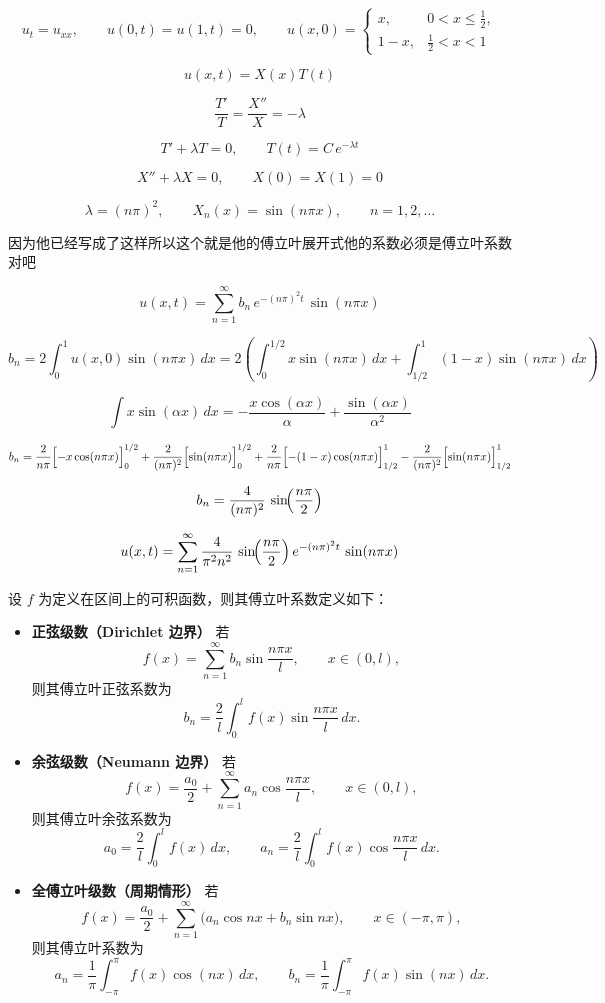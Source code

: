 \begin{solution}
\[
u_t=u_{xx},\qquad u(0,t)=u(1,t)=0,\qquad 
u(x,0)=
\begin{cases}
x,&0<x\le \frac12,\\[2pt]
1-x,&\frac12<x<1
\end{cases}
\]

\[
u(x,t)=X(x)T(t)
\]

\[
\frac{T'}{T}=\frac{X''}{X}=-\lambda
\]

\[
T'+\lambda T=0,\qquad T(t)=C\,e^{-\lambda t}
\]

\[
X''+\lambda X=0,\qquad X(0)=X(1)=0
\]

\[
\lambda=(n\pi)^2,\qquad X_n(x)=\sin(n\pi x),\qquad n=1,2,\ldots
\]
\begin{dxtips}[正交系数]
    因为他已经写成了这样所以这个就是他的傅立叶展开式他的系数必须是傅立叶系数对吧
\end{dxtips}
\[
u(x,t)=\sum_{n=1}^{\infty}b_n\,e^{-(n\pi)^2 t}\,\sin(n\pi x)
\]

\[
b_n=2\int_{0}^{1}u(x,0)\sin(n\pi x)\,dx
=2\!\left(\int_{0}^{1/2}x\sin(n\pi x)\,dx+\int_{1/2}^{1}(1-x)\sin(n\pi x)\,dx\right)
\]

\[
\int x\sin(\alpha x)\,dx=-\frac{x\cos(\alpha x)}{\alpha}+\frac{\sin(\alpha x)}{\alpha^2}
\]

\[
b_n=\frac{2}{n\pi}\Bigl[-x\cos(n\pi x)\Bigr]_{0}^{1/2}
+\frac{2}{(n\pi)^2}\Bigl[\sin(n\pi x)\Bigr]_{0}^{1/2}
+\frac{2}{n\pi}\Bigl[-(1-x)\cos(n\pi x)\Bigr]_{1/2}^{1}
-\frac{2}{(n\pi)^2}\Bigl[\sin(n\pi x)\Bigr]_{1/2}^{1}
\]

\[
b_n=\frac{4}{(n\pi)^2}\,\sin\!\Bigl(\frac{n\pi}{2}\Bigr)
\]

\[
u(x,t)=\sum_{n=1}^{\infty}\frac{4}{\pi^2 n^2}\,\sin\!\Bigl(\frac{n\pi}{2}\Bigr)\,e^{-(n\pi)^2 t}\,\sin(n\pi x)
\]   
\end{solution}
\begin{definition}
设 $f$ 为定义在区间上的可积函数，则其傅立叶系数定义如下：
\begin{itemize}
  \item \textbf{正弦级数（Dirichlet 边界）}  
  若
  \[
  f(x)=\sum_{n=1}^{\infty} b_n \sin\frac{n\pi x}{l},
  \qquad x\in(0,l),
  \]
  则其傅立叶正弦系数为
  \[
  b_n=\frac{2}{l}\int_0^l f(x)\sin\frac{n\pi x}{l}\,dx.
  \]

  \item \textbf{余弦级数（Neumann 边界）}  
  若
  \[
  f(x)=\frac{a_0}{2}+\sum_{n=1}^{\infty} a_n \cos\frac{n\pi x}{l},
  \qquad x\in(0,l),
  \]
  则其傅立叶余弦系数为
  \[
  a_0=\frac{2}{l}\int_0^l f(x)\,dx,
  \qquad
  a_n=\frac{2}{l}\int_0^l f(x)\cos\frac{n\pi x}{l}\,dx.
  \]

  \item \textbf{全傅立叶级数（周期情形）}  
  若
  \[
  f(x)=\frac{a_0}{2}+\sum_{n=1}^{\infty}
  \bigl(a_n\cos nx+b_n\sin nx\bigr),
  \qquad x\in(-\pi,\pi),
  \]
  则其傅立叶系数为
  \[
  a_n=\frac{1}{\pi}\int_{-\pi}^{\pi} f(x)\cos(nx)\,dx,
  \qquad
  b_n=\frac{1}{\pi}\int_{-\pi}^{\pi} f(x)\sin(nx)\,dx.
  \]
\end{itemize}
\end{definition}
